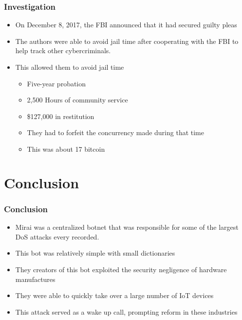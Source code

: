 \documentclass{beamer}
\begin{document}
\begin{frame}
	\frametitle{Investigation}
	\begin{itemize}
		\item On December 8, 2017, the FBI announced that it had secured guilty pleas
		\item The authors were able to avoid jail time after cooperating with the FBI to help track other cybercriminals.
		\item This allowed them to avoid jail time
		\begin{itemize}
			\item Five-year probation
			\item 2,500 Hours of community service
			\item \$127,000 in restitution
			\item They had to forfeit the concurrency made during that time
			\item This was about 17 bitcoin
		\end{itemize}
	\end{itemize}
\end{frame}

\section{Conclusion}

\begin{frame}
	\frametitle{Conclusion}
	\begin{itemize}
		\item Mirai was a centralized botnet that was responsible for some of the largest DoS attacks every recorded.
		\item This bot was relatively simple with small dictionaries
		\item They creators of this bot exploited the security negligence of hardware manufactures
		\item They were able to quickly take over a large number of IoT devices
		\item This attack served as a wake up call, prompting reform in these industries
	\end{itemize}
\end{frame}
\end{document}
